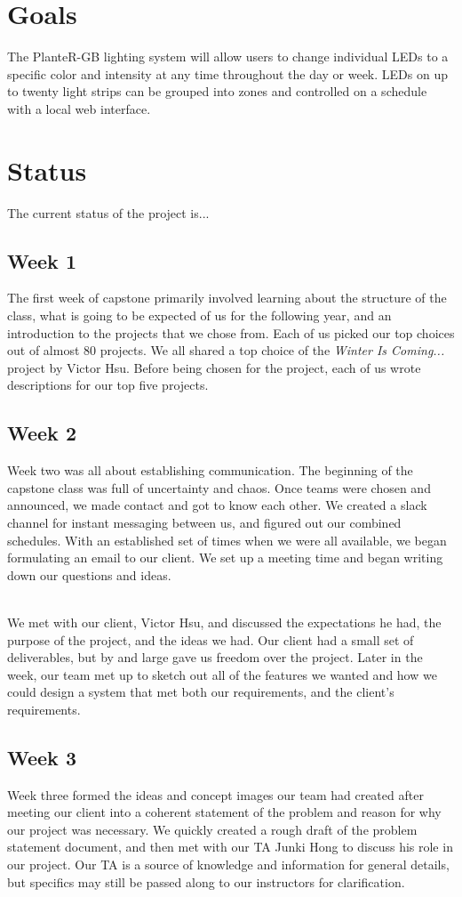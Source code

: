 \documentclass[onecolumn, draftclsnofoot,10pt, compsoc]{IEEEtran}
\begin{document}
	\section{Goals}
	The PlanteR-GB lighting system will allow users to change individual LEDs to a specific color and intensity at any time throughout the day or week.
	LEDs on up to twenty light strips can be grouped into zones and controlled on a schedule with a local web interface.

	\section{Status}
	The current status of the project is...
		\subsection{Week 1}
		The first week of capstone primarily involved learning about the structure of the class, what is going to be expected of us for the following year, and an introduction to the projects that we chose from.
		Each of us picked our top choices out of almost 80 projects. We all shared a top choice of the \textit{Winter Is Coming...} project by Victor Hsu.
		Before being chosen for the project, each of us wrote descriptions for our top five projects.

		\subsection{Week 2}
		Week two was all about establishing communication. The beginning of the capstone class was full of uncertainty and chaos.
		Once teams were chosen and announced, we made contact and got to know each other. We created a slack channel for instant messaging between us, and figured out our combined schedules.
		With an established set of times when we were all available, we began formulating an email to our client. We set up a meeting time and began writing down our questions and ideas.

		\noindent \\We met with our client, Victor Hsu, and discussed the expectations he had, the purpose of the project, and the ideas we had.
		Our client had a small set of deliverables, but by and large gave us freedom over the project.
		Later in the week, our team met up to sketch out all of the features we wanted and how we could design a system that met both our requirements, and the client's requirements.

		\subsection{Week 3}
		Week three formed the ideas and concept images our team had created after meeting our client into a coherent statement of the problem and reason for why our project was necessary.
		We quickly created a rough draft of the problem statement document, and then met with our TA Junki Hong to discuss his role in our project.
		Our TA is a source of knowledge and information for general details, but specifics may still be passed along to our instructors for clarification.
\end{document}
